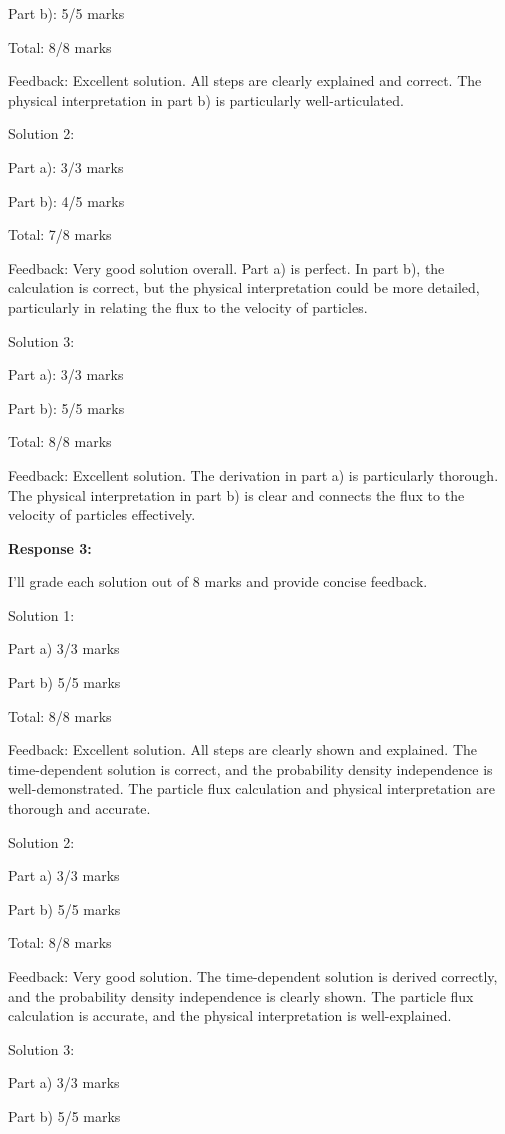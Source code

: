 \documentclass[a4paper,11pt]{article}
\begin{document}
Part b): 5/5 marks

Total: 8/8 marks

Feedback: Excellent solution. All steps are clearly explained and correct. The physical interpretation in part b) is particularly well-articulated.

Solution 2:

Part a): 3/3 marks

Part b): 4/5 marks

Total: 7/8 marks

Feedback: Very good solution overall. Part a) is perfect. In part b), the calculation is correct, but the physical interpretation could be more detailed, particularly in relating the flux to the velocity of particles.

Solution 3:

Part a): 3/3 marks

Part b): 5/5 marks

Total: 8/8 marks

Feedback: Excellent solution. The derivation in part a) is particularly thorough. The physical interpretation in part b) is clear and connects the flux to the velocity of particles effectively.

\bigskip   
\textbf{Response 3:}

I'll grade each solution out of 8 marks and provide concise feedback.

Solution 1:

Part a) 3/3 marks

Part b) 5/5 marks

Total: 8/8 marks

Feedback: Excellent solution. All steps are clearly shown and explained. The time-dependent solution is correct, and the probability density independence is well-demonstrated. The particle flux calculation and physical interpretation are thorough and accurate.

Solution 2:

Part a) 3/3 marks

Part b) 5/5 marks

Total: 8/8 marks

Feedback: Very good solution. The time-dependent solution is derived correctly, and the probability density independence is clearly shown. The particle flux calculation is accurate, and the physical interpretation is well-explained.

Solution 3:

Part a) 3/3 marks

Part b) 5/5 marks
\end{document}
